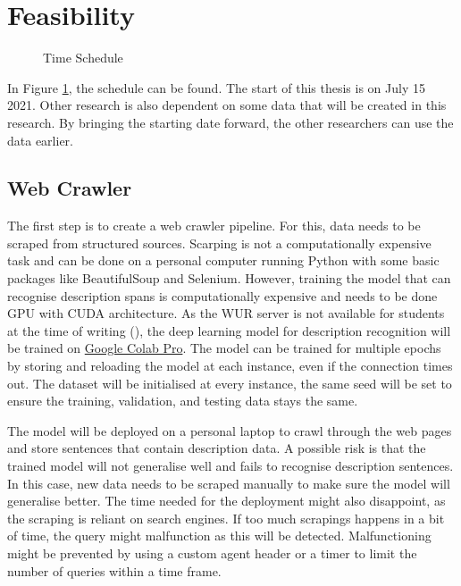 \documentclass[a4paper, 12pt, oneside]{book} %
\begin{document}
\section{Feasibility}

\begin{figure} [ht]
    \centering
    \vspace{0cm}
    \hspace{-1.3cm}
    \makebox[\textwidth][c]{}
    \caption{Time Schedule}
    \label{fig:time_schedule}
\end{figure}

In Figure \ref{fig:time_schedule}, the schedule can be found. 
The start of this thesis is on July 15 2021.
Other research is also dependent on some data that will be created in this research.
By bringing the starting date forward, the other researchers can use the data earlier.


\subsection{Web Crawler}
The first step is to create a web crawler pipeline. 
For this, data needs to be scraped from structured sources.
Scarping is not a computationally expensive task and can be done on a personal computer running Python with some basic packages like BeautifulSoup and Selenium.
However, training the model that can recognise description spans is computationally expensive and needs to be done GPU with CUDA architecture.
As the WUR server is not available for students at the time of writing (\thedate), the deep learning model for description recognition will be trained on \href{https://colab.research.google.com/}{Google Colab Pro}. 
The model can be trained for multiple epochs by storing and reloading the model at each instance, even if the connection times out.
The dataset will be initialised at every instance, the same seed will be set to ensure the training, validation, and testing data stays the same.

The model will be deployed on a personal laptop to crawl through the web pages and store sentences that contain description data.
A possible risk is that the trained model will not generalise well and fails to recognise description sentences.
In this case, new data needs to be scraped manually to make sure the model will generalise better.
The time needed for the deployment might also disappoint, as the scraping is reliant on search engines.
If too much scrapings happens in a bit of time, the query might malfunction as this will be detected.
Malfunctioning might be prevented by using a custom agent header or a timer to limit the number of queries within a time frame.
\end{document}
